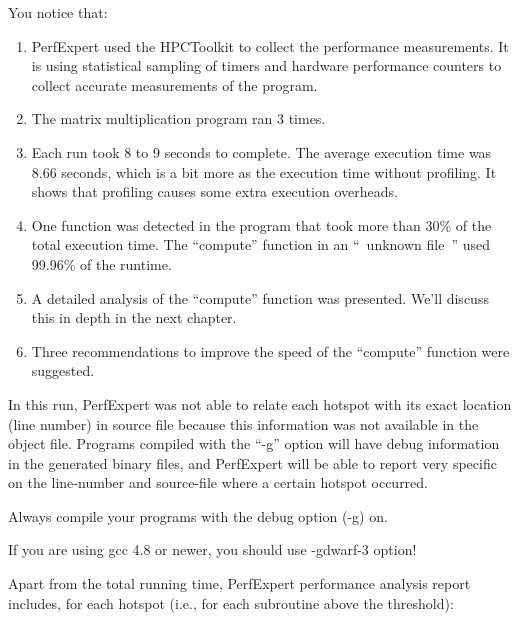 You notice that:

\begin{enumerate}
  \item  PerfExpert used the HPCToolkit to collect the performance measurements. It is using statistical sampling of timers and hardware performance counters to collect accurate measurements of the program.
  \item  The matrix multiplication program ran 3 times.
  \item  Each run took 8 to 9 seconds to complete. The average execution time was 8.66 seconds, which is a bit more as the execution time without profiling. It shows that profiling causes some extra execution overheads.
  \item  One function was detected in the program that took more than 30\% of the total execution time. The ``compute'' function in an ``~unknown file~'' used 99.96\% of the runtime.
  \item  A detailed analysis of the ``compute'' function was presented. We'll discuss this in depth in the next chapter.
  \item  Three recommendations to improve the speed of the ``compute'' function were suggested.
\end{enumerate}

In this run, PerfExpert was not able to relate each hotspot with its exact location (line number) in source file because this information was not available in the object file. Programs compiled with the ``-g'' option will have debug information in the generated binary files, and PerfExpert will be able to report very specific on the line-number and source-file where a certain hotspot occurred.

\begin{tip}
Always compile your programs with the debug option (-g) on.
\end{tip}

\begin{tip}
If you are using gcc 4.8 or newer, you should use -gdwarf-3 option!
\end{tip}


Apart from the total running time, PerfExpert performance analysis report includes, for each hotspot (i.e., for each subroutine above the threshold):

